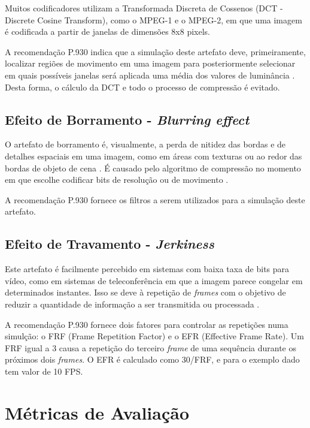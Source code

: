 Muitos codificadores utilizam a Transformada Discreta de Cossenos (DCT - Discrete Cosine Transform), como o MPEG-1 e o MPEG-2, em que uma imagem é codificada a partir de janelas de dimensões 8x8 pixels. 

A recomendação P.930 indica que a simulação deste artefato deve, primeiramente, localizar regiões de movimento em uma imagem para posteriormente selecionar em quais possíveis janelas será aplicada uma média dos valores de luminância \cite{itup930}. Desta forma, o cálculo da DCT e todo o processo de compressão é evitado.

\subsection{Efeito de Borramento - \emph{Blurring effect}}

O artefato de borramento é, visualmente, a perda de nitidez das bordas e de detalhes espaciais em uma imagem, como em áreas com texturas ou ao redor das bordas de objeto de cena \cite{wurao2005}. É causado pelo algoritmo de compressão no momento em que escolhe codificar bits de resolução ou de movimento \cite{itup930}.

A recomendação P.930 fornece os filtros a serem utilizados para a simulação deste artefato.

\subsection{Efeito de Travamento - \emph{Jerkiness}}

Este artefato é facilmente percebido em sistemas com baixa taxa de bits para vídeo, como em sistemas de teleconferência \cite{itup930} em que a imagem parece congelar em determinados instantes. Isso se deve à repetição de \emph{frames} com o objetivo de reduzir a quantidade de informação a ser transmitida ou processada \cite{itup930}.

A recomendação P.930 fornece dois fatores para controlar as repetições numa simulção: o FRF (Frame Repetition Factor) e o EFR (Effective Frame Rate). Um FRF igual a 3 causa a repetição do terceiro \emph{frame} de uma sequência durante os próximos dois \emph{frames}. O EFR é calculado como 30/FRF, e para o exemplo dado tem valor de 10 FPS.

\section{Métricas de Avaliação}

